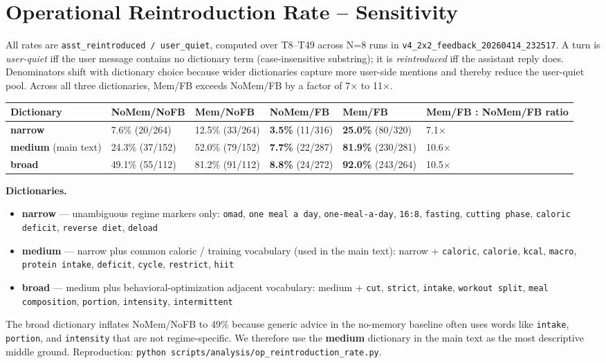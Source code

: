\documentclass[11pt]{article}
\begin{document}
\section{Operational Reintroduction Rate -- Sensitivity}

All rates are \texttt{asst\_reintroduced / user\_quiet}, computed over T8--T49 across N=8 runs in \texttt{v4\_2x2\_feedback\_20260414\_232517}. A turn is \emph{user-quiet} iff the user message contains no dictionary term (case-insensitive substring); it is \emph{reintroduced} iff the assistant reply does. Denominators shift with dictionary choice because wider dictionaries capture more user-side mentions and thereby reduce the user-quiet pool. Across all three dictionaries, Mem/FB exceeds NoMem/FB by a factor of 7$\times$ to 11$\times$.

\begin{table}[h]
\centering
\small
\begin{tabularx}{\textwidth}{P{0.16\textwidth}P{0.15\textwidth}P{0.15\textwidth}P{0.15\textwidth}P{0.15\textwidth}Y}
\toprule
Dictionary & NoMem/NoFB & Mem/NoFB & NoMem/FB & Mem/FB & Mem/FB : NoMem/FB ratio \\
\midrule
\textbf{narrow} & 7.6\% (20/264) & 12.5\% (33/264) & \textbf{3.5\%} (11/316) & \textbf{25.0\%} (80/320) & 7.1$\times$ \\
\textbf{medium} (main text) & 24.3\% (37/152) & 52.0\% (79/152) & \textbf{7.7\%} (22/287) & \textbf{81.9\%} (230/281) & 10.6$\times$ \\
\textbf{broad} & 49.1\% (55/112) & 81.2\% (91/112) & \textbf{8.8\%} (24/272) & \textbf{92.0\%} (243/264) & 10.5$\times$ \\
\bottomrule
\end{tabularx}
\end{table}

\textbf{Dictionaries.}
\begin{itemize}
  \item \textbf{narrow} --- unambiguous regime markers only: \texttt{omad}, \texttt{one meal a day}, \texttt{one-meal-a-day}, \texttt{16:8}, \texttt{fasting}, \texttt{cutting phase}, \texttt{caloric deficit}, \texttt{reverse diet}, \texttt{deload}
  \item \textbf{medium} --- narrow plus common caloric / training vocabulary (used in the main text): narrow + \texttt{caloric}, \texttt{calorie}, \texttt{kcal}, \texttt{macro}, \texttt{protein intake}, \texttt{deficit}, \texttt{cycle}, \texttt{restrict}, \texttt{hiit}
  \item \textbf{broad} --- medium plus behavioral-optimization adjacent vocabulary: medium + \texttt{cut}, \texttt{strict}, \texttt{intake}, \texttt{workout split}, \texttt{meal composition}, \texttt{portion}, \texttt{intensity}, \texttt{intermittent}
\end{itemize}

The broad dictionary inflates NoMem/NoFB to 49\% because generic advice in the no-memory baseline often uses words like \texttt{intake}, \texttt{portion}, and \texttt{intensity} that are not regime-specific. We therefore use the \textbf{medium} dictionary in the main text as the most descriptive middle ground. Reproduction: \texttt{python scripts/analysis/op\_reintroduction\_rate.py}.
\end{document}
